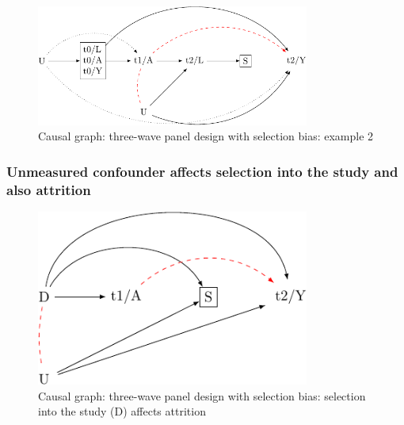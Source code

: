 \documentclass[
  singlecolumn]{report}
\begin{document}
\begin{figure}

{\centering \includegraphics[width=0.8\textwidth,height=\textheight]{causal-dags_files/figure-pdf/fig-dag-8-2-1.pdf}

}

\caption{\label{fig-dag-8-2}Causal graph: three-wave panel design with
selection bias: example 2}

\end{figure}

\hypertarget{unmeasured-confounder-affects-selection-into-the-study-and-also-attrition}{%
\subsubsection{Unmeasured confounder affects selection into the study
and also
attrition}\label{unmeasured-confounder-affects-selection-into-the-study-and-also-attrition}}

\begin{figure}

{\centering \includegraphics[width=0.8\textwidth,height=\textheight]{causal-dags_files/figure-pdf/fig-dag-8-4-1.pdf}

}

\caption{\label{fig-dag-8-4}Causal graph: three-wave panel design with
selection bias: selection into the study (D) affects attrition}

\end{figure}
\end{document}
